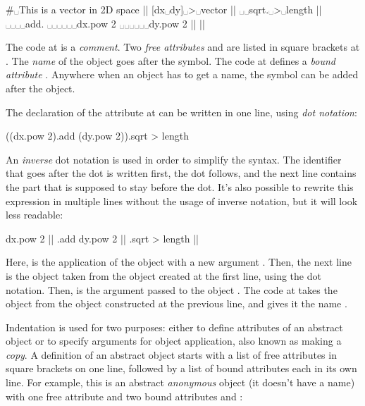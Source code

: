 \begin{ffcode}
#␣This is a vector in 2D space |$\label{ln:comment}$|
[dx␣dy]␣>␣vector |$\label{ln:vector}$|
␣␣sqrt.␣>␣length |$\label{ln:length}$|
␣␣␣␣add.
␣␣␣␣␣␣dx.pow 2
␣␣␣␣␣␣dy.pow 2 |$\label{ln:length-end}$| |$\label{ln:vector-end}$|
\end{ffcode}

The code at  is a \emph{comment}.
Two \emph{free attributes}  and 
are listed in square brackets at .
The \emph{name} of the object goes after the \ff{>} symbol.
The code at  defines
a \emph{bound attribute} . Anywhere when an object
has to get a name, the \ff{>} symbol can be added after the object.

The declaration of the attribute  at 
can be written in one line, using \emph{dot notation}:

\begin{ffcode}
((dx.pow 2).add (dy.pow 2)).sqrt > length
\end{ffcode}

An \emph{inverse} dot notation is used in order to simplify
the syntax. The identifier that goes after the dot is written
first, the dot follows, and the next line contains the part
that is supposed to stay before the dot. It's also possible to rewrite
this expression in multiple lines without the usage of
inverse notation, but it will look less readable:

\begin{ffcode}
dx.pow 2 |$\label{ln:dx-pow}$|
.add
  dy.pow 2 |$\label{ln:dx-pow-2}$|
.sqrt > length |$\label{ln:dx-pow-3}$|
\end{ffcode}

Here,  is the application of the object  with
a new argument . Then, the next line is the object  taken
from the object created at the first line, using the dot notation. Then,
 is the argument passed to the object .
The code at  takes the object  from the object constructed
at the previous line, and gives it the name .

Indentation is used for two purposes: either to define attributes
of an abstract object or to specify arguments for object application, also
known as making a \emph{copy}.
A definition of an abstract object starts with a list of free attributes
in square brackets on one line, followed by a list of bound attributes
each in its own line. For example, this is an abstract \emph{anonymous} object
(it doesn't have a name)
with one free attribute  and two bound attributes  and :

